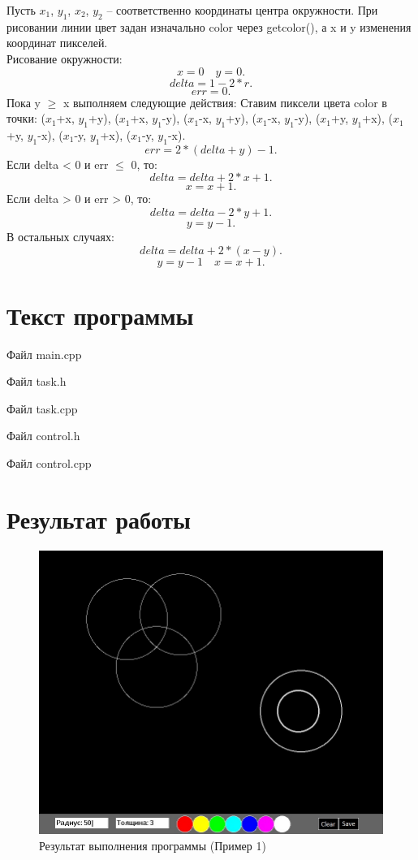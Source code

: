 \documentclass[14pt, a4paper]{extreport}
\begin{document}
Пусть $x_1$, $y_1$, $x_2$, $y_2$ -- соответственно координаты центра окружности.
При рисовании линии цвет задан изначально color через getcolor(), а x и y изменения координат пикселей.\\
Рисование окружности:
$$ x = 0 \quad y = 0 . $$
$$ delta = 1-2*r . $$
$$ err = 0 . $$
Пока y $\geq$ x выполняем следующие действия:
Ставим пиксели цвета color в точки: ($x_1$+x, $y_1$+y), ($x_1$+x, $y_1$-y), ($x_1$-x, $y_1$+y), ($x_1$-x, $y_1$-y), ($x_1$+y, $y_1$+x), ($x_1$+y, $y_1$-x), ($x_1$-y, $y_1$+x), ($x_1$-y, $y_1$-x).
$$ err = 2*(delta+y)-1 . $$
Если delta < 0 и err $\leq$ 0, то:
$$ delta = delta+2*x+1 . $$
$$ x = x+1 . $$
Если delta > 0 и err > 0, то:
$$ delta = delta-2*y+1 . $$
$$ y = y-1 . $$
В остальных случаях:
$$ delta = delta+2*(x-y) . $$
$$ y = y-1 \quad x = x+1 . $$

\chapter{Текст программы}

\noindent Файл main.cpp

\pagebreak
\hrulefill

\noindent Файл task.h

\hrulefill

\noindent Файл task.cpp

\hrulefill

\noindent Файл control.h

\hrulefill

\noindent Файл control.cpp


\chapter{Результат работы}

\begin{figure}[h!]
	\centering
	\includegraphics[width = 12cm]{image/image_1}
  \caption{Результат выполнения программы (Пример 1)}
\end{figure}
\end{document}
